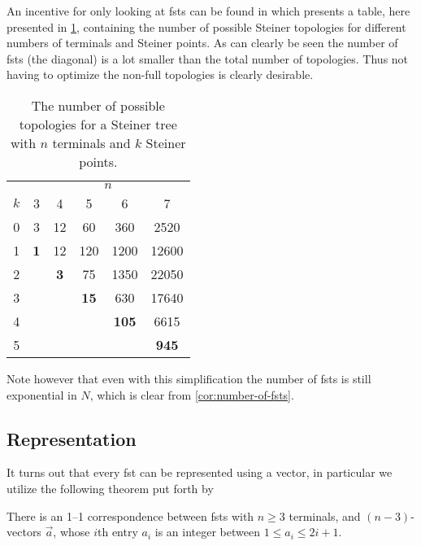 An incentive for only looking at \acp{fst} can be found in \textcite{gilbert1968}
which presents a table, here presented in \cref{tab:number-of-topologies},
containing the number of possible Steiner topologies for different numbers of
terminals and Steiner points. As can clearly be seen the number of \acp{fst}
(the diagonal) is a lot smaller than the total number of topologies. Thus not
having to optimize the non-full topologies is clearly desirable.

\begin{table}[htbp]
  \centering
  \begin{tabular}{cccccc}
    \toprule
    & \multicolumn{5}{c}{$n$} \\
    $k$ & 3    & 4    & 5     & 6      & 7      \\
    \cmidrule(r){1-1}\cmidrule(l){2-6}
    0   & 3          & 12         & 60          & 360          & 2520         \\
    1   & \textbf{1} & 12         & 120         & 1200         & 12600        \\
    2   &            & \textbf{3} & 75          & 1350         & 22050        \\
    3   &            &            & \textbf{15} & 630          & 17640        \\
    4   &            &            &             & \textbf{105} & 6615         \\
    5   &            &            &             &              & \textbf{945} \\
    \bottomrule
  \end{tabular}
  \caption[Number of possible topologies]{The number of possible topologies for a Steiner tree with $n$
    terminals and $k$ Steiner points.\label{tab:number-of-topologies}}
\end{table}

Note however that even with this simplification the number of \acp{fst} is
still exponential in $N$, which is clear from \cref{cor:number-of-fsts}.

\subsection{Representation}
\label{sec:representation}

It turns out that every \ac{fst} can be represented using a vector, in
particular we utilize the following theorem put forth by \textcite{smith1992}

\begin{theorem}
  There is an 1--1 correspondence between \acp{fst} with $n \ge 3$ terminals,
  and $(n-3)$-vectors $\vec{a}$, whose $i$th entry $a_i$ is an integer between
  $1 \le a_i \le 2 i + 1$.
\end{theorem}

